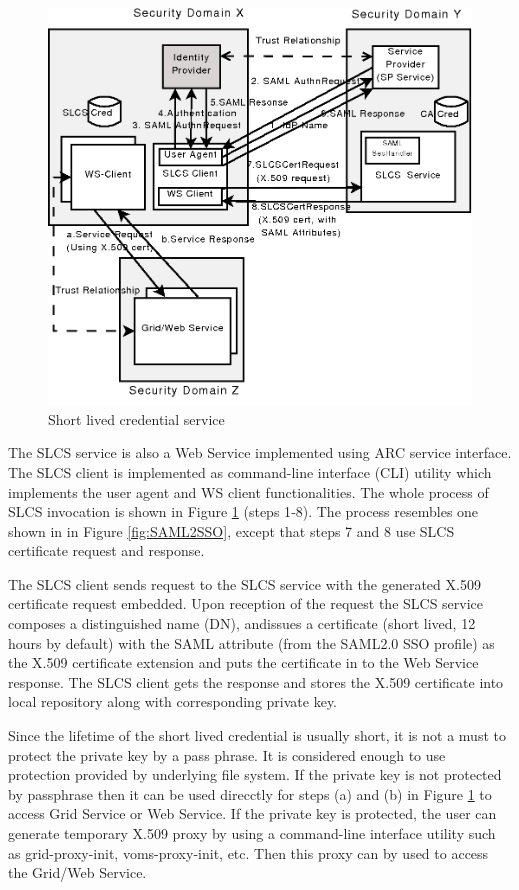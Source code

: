 \documentclass[twocolumn]{svjour3}         %
\begin{document}
\begin{figure}
\includegraphics[width=0.9\columnwidth]{SLCS.png}
\caption{Short lived credential service}
\label{fig:SLCS}
\end{figure}
The SLCS service is also a Web Service implemented using ARC service interface. The SLCS client is implemented as command-line interface (CLI) utility which implements the user agent and WS client functionalities. The whole process of SLCS invocation is shown in Figure \ref{fig:SLCS} (steps 1‑8). The process resembles one shown in in Figure \ref{fig:SAML2SSO}, except that steps 7 and 8 use SLCS certificate request and response.

The SLCS client sends request to the SLCS service with the generated X.509 certificate request embedded. Upon reception of the request the SLCS service  composes a distinguished name (DN), andissues a certificate (short lived, 12 hours by default) with the SAML attribute (from the SAML2.0 SSO profile) as the X.509 certificate extension and puts the certificate in to the Web Service response. The SLCS client gets the response and stores the X.509 certificate into local repository along with corresponding private key.

Since the lifetime of the short lived credential is usually short, it is not a must to protect the private key by a pass phrase. It is considered enough to use protection  provided by underlying file system. If the private key is not protected by passphrase then it can be used direcctly for steps (a) and (b) in Figure \ref{fig:SLCS} to access Grid Service or Web Service. If the private key is protected, the user can generate temporary  X.509 proxy by using a command-line interface utility such as grid-proxy-init, voms-proxy-init, etc. Then this proxy can by used  to access the Grid/Web Service.
\end{document}

